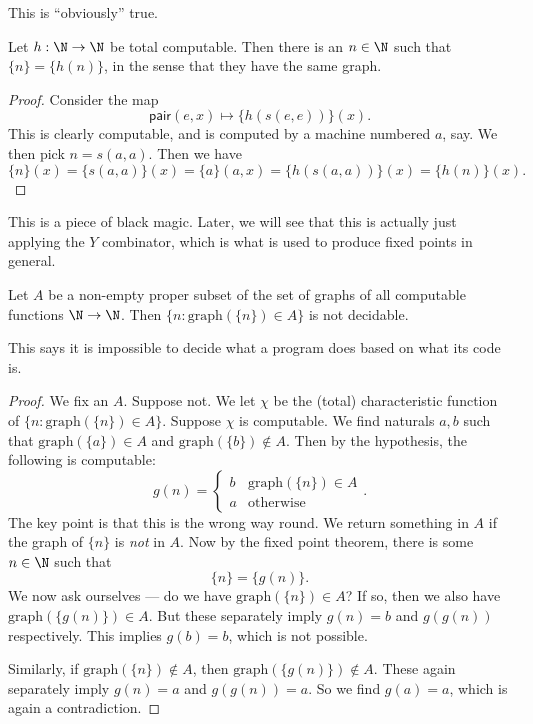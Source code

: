 \documentclass[a4paper]{article}
\newcommand\pair{\mathsf{pair}}
\begin{document}
This is ``obviously'' true.

\begin{thm}
  Let $h: \N \to \N$ be total computable. Then there is an $n \in \N$ such that $\{n\} = \{h(n)\}$, in the sense that they have the same graph.
\end{thm}

\begin{proof}
  Consider the map
  \[
    \pair(e, x) \mapsto \{h(s(e, e))\}(x).
  \]
  This is clearly computable, and is computed by a machine numbered $a$, say. We then pick $n = s(a, a)$. Then we have
  \[
    \{n\}(x) = \{s(a, a)\}(x) = \{a\}(a, x) = \{h(s(a, a))\}(x) = \{h(n)\}(x).
  \]
\end{proof}
This is a piece of black magic. Later, we will see that this is actually just applying the $Y$ combinator, which is what is used to produce fixed points in general.

\begin{thm}
  Let $A$ be a non-empty proper subset of the set of graphs of all computable functions $\N \to \N$. Then $\{n: \mathrm{graph}(\{n\}) \in A\}$ is not decidable.
\end{thm}
This says it is impossible to decide what a program does based on what its code is.

\begin{proof}
  We fix an $A$. Suppose not. We let $\chi$ be the (total) characteristic function of $\{n: \mathrm{graph}(\{n\}) \in A\}$. Suppose $\chi$ is computable. We find naturals $a, b$ such that $\mathrm{graph}(\{a\}) \in A$ and $\mathrm{graph}(\{b\}) \not\in A$. Then by the hypothesis, the following is computable:
  \[
    g(n) =
    \begin{cases}
      b & \mathrm{graph}(\{n\}) \in A\\
      a & \text{otherwise}
    \end{cases}.
  \]
  The key point is that this is the wrong way round. We return something in $A$ if the graph of $\{n\}$ is \emph{not} in $A$. Now by the fixed point theorem, there is some $n \in \N$ such that
  \[
    \{n\} = \{g(n)\}.
  \]
  We now ask ourselves --- do we have $\mathrm{graph}(\{n\}) \in A$? If so, then we also have $\mathrm{graph}(\{g(n)\}) \in A$. But these separately imply $g(n) = b$ and $g(g(n))$ respectively. This implies $g(b) = b$, which is not possible.

  Similarly, if $\mathrm{graph}(\{n\}) \not \in A$, then $\mathrm{graph}(\{g(n)\}) \not \in A$. These again separately imply $g(n) = a$ and $g(g(n)) = a$. So we find $g(a) = a$, which is again a contradiction.
\end{proof}
\end{document}
